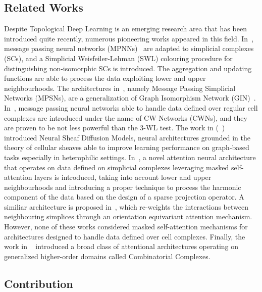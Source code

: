 \documentclass{article}
\begin{document}
\subsection{Related Works}
Despite Topological Deep Learning is an emerging research area that has been introduced quite recently, numerous pioneering works appeared in this field. In~\cite{bodnar2021weisfeiler}, message passing neural networks (MPNNs)~\cite{gilmer2017neural} are adapted to simplicial complexes (SCs), and a Simplicial Weisfeiler-Lehman (SWL) colouring procedure for distinguishing non-isomorphic SCs is introduced. The aggregation and updating functions are able to process the data exploiting lower and upper neighbourhoods. The architectures in~\cite{bodnar2021weisfeiler}, namely Message Passing Simplicial Networks (MPSNs), are a generalization of Graph Isomorphism Network (GIN)~\cite{xu2018powerful}.  In~\cite{bodnarcwnet}, message passing neural networks able to handle data defined over regular cell complexes are introduced under the name of CW Networks (CWNs), and they are proven to be not less powerful than the 3-WL test. The work in (~\cite{sheaf2022}) introduced Neural Sheaf Diffusion Models, neural architectures grounded in the theory of cellular sheaves able to improve learning performance on graph-based tasks especially in heterophilic settings. In~\cite{giusti22}, a novel attention neural architecture that operates on data defined on simplicial complexes leveraging masked self-attention layers is introduced, taking into account lower and upper neighbourhoods and introducing a proper technique to process the harmonic component of the data based on the design of a sparse projection operator. A similiar architecture is proposed in~\cite{anonymous2022SAT}, which re-weights the interactions between neighbouring simplices through an orientation equivariant attention mechanism. However, none of these works considered masked self-attention mechanisms for architectures designed to handle data defined over cell complexes. Finally, the work in ~\cite{hajij2022} introduced a broad class of attentional architectures operating on generalized higher-order domains called Combinatorial Complexes. 

\subsection{Contribution}
\end{document}
